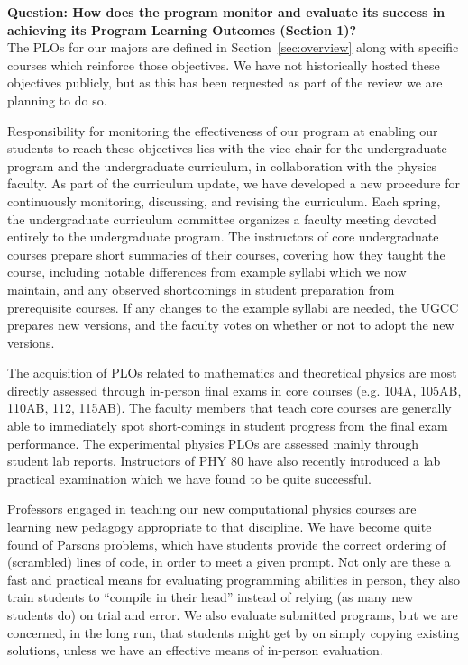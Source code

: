 \documentclass[12pt]{article}
\begin{document}
{\bf Question: How does the program monitor and evaluate its success
  in achieving its Program Learning Outcomes (Section 1)?}\\[3pt]

\noindent
The PLOs for our majors are defined in Section~\ref{sec:overview}
along with specific courses which reinforce those objectives.  We have
not historically hosted these objectives publicly, but as this has
been requested as part of the review we are planning to do
so. 

Responsibility for monitoring the effectiveness of our program at
enabling our students to reach these objectives lies with the
vice-chair for the undergraduate program and the undergraduate
curriculum, in collaboration with the physics faculty.  As part of the
curriculum update, we have developed a new procedure for continuously
monitoring, discussing, and revising the curriculum.  Each spring, the
undergraduate curriculum committee organizes a faculty meeting devoted
entirely to the undergraduate program.  The instructors of core
undergraduate courses prepare short summaries of their courses,
covering how they taught the course, including notable differences
from example syllabi which we now maintain, and any observed
shortcomings in student preparation from prerequisite courses.  If any
changes to the example syllabi are needed, the UGCC prepares new
versions, and the faculty votes on whether or not to adopt the new
versions.

The acquisition of PLOs related to mathematics and theoretical physics
are most directly assessed through in-person final exams in core
courses (e.g. 104A, 105AB, 110AB, 112, 115AB).  The faculty members
that teach core courses are generally able to immediately spot
short-comings in student progress from the final exam performance.
The experimental physics PLOs are assessed mainly through student lab
reports.  Instructors of PHY 80 have also recently introduced a lab
practical examination which we have found to be quite successful.

Professors engaged in teaching our new computational physics courses
are learning new pedagogy appropriate to that discipline.  We have
become quite found of Parsons problems, which have students provide
the correct ordering of (scrambled) lines of code, in order to meet a
given prompt.  Not only are these a fast and practical means for
evaluating programming abilities in person, they also train students
to ``compile in their head'' instead of relying (as many new students
do) on trial and error.  We also evaluate submitted programs, but we
are concerned, in the long run, that students might get by on simply
copying existing solutions, unless we have an effective means of
in-person evaluation.
\end{document}
